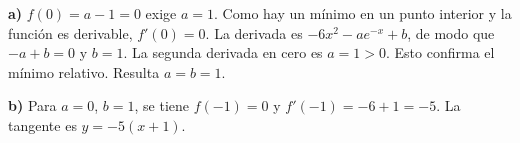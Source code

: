 \textbf{a)} $f(0)=a-1=0$ exige $a=1$. Como hay un mínimo
en un punto interior y la función es derivable, $f'(0)=0$.
La derivada es $-6x^2-ae^{-x}+b$, de modo que $-a+b=0$
y $b=1$. La segunda derivada en cero es $a=1>0$.
Esto confirma el mínimo relativo. Resulta $\boxed{a=b=1}$.

\textbf{b)} Para $a=0$, $b=1$, se tiene $f(-1)=0$ y
$f'(-1)=-6+1=-5$. La tangente es $\boxed{y=-5(x+1)}$.
